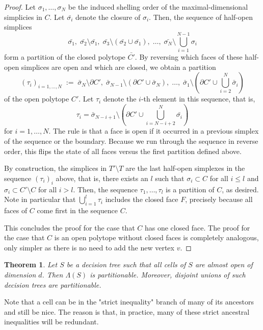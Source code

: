 \documentclass[12pt,reqno]{amsart}
\numberwithin{definition}{section}
\newtheorem{theorem}[definition]{Theorem}
\theoremstyle{definition}
\newcommand{\allow}{\Lambda} %
\begin{document}
\begin{proof}
Let $\sigma_1,\ldots,\sigma_N$ be the induced shelling order of the maximal-dimensional simplicies in $C$. Let $\bar{\sigma_i}$ denote the closure of $\sigma_i$. Then, the sequence of half-open simplices
\[
  \bar{\sigma_1}, \; \bar{\sigma_2}\setminus \bar{\sigma_1}, \; \bar{\sigma_3}\setminus  (\bar{\sigma_2} \cup \bar{\sigma_1}), \; \ldots, \; \bar{\sigma_N} \setminus \bigcup_{i=1}^{N-1} \sigma_i
\]
form a partition of the closed polytope $\bar{C'}$. By reversing which faces of these half-open simplices are open and which are closed, we obtain a partition 
\[
  (\tau_i)_{i=1,\ldots,N}\;  :=\; \bar{\sigma}_N\setminus \partial C' ,\;  \bar{\sigma}_{N-1}\setminus (\partial C' \cup\bar{\sigma}_N),\;  \ldots,\;  \bar{\sigma}_1 \setminus  (\partial C' \cup \bigcup_{i=2}^N \bar{\sigma}_i)
\]
of the open polytope $C'$. Let $\tau_i$ denote the $i$-th element in this sequence, that is, 
\[
  \tau_i = \bar{\sigma}_{N-i+1} \setminus (\partial C' \cup \bigcup_{i=N-i+2}^N \bar{\sigma_i})
\]
for $i=1,\ldots,N$. The rule is that a face is open if it occurred in a previous simplex of the sequence or the boundary. Because we run through the sequence in reverse order, this flips the state of all faces versus the first partition defined above.

By construction, the simplices in $T'\setminus T$ are the last half-open simplexes in the sequence $(\tau_i)_i$ above, that is, there exists an $l$ such that $\sigma_i\subset C$ for all $i\leq l$ and $\sigma_i\subset C'\setminus C$ for all $i>l$. Then, the sequence $\tau_1,\ldots,\tau_l$ is a partition of $C$, as desired. Note in particular that $\bigcup_{i=1}^l \tau_i$ includes the closed face $F$, precisely because all faces of $C$ come first in the sequence $C$.

This concludes the proof for the case that $C$ has one closed face. The proof for the case that $C$ is an open polytope without closed faces is completely analogous, only simpler as there is no need to add the new vertex $v$.
\end{proof}

\begin{theorem}
Let $S$ be a decision tree such that all cells of $S$ are almost open of dimension $d$. Then $\allow(S)$ is partitionable. Moreover, disjoint unions of such decision trees are partitionable.
\end{theorem}

Note that a cell can be in the "strict inequality" branch of many of its ancestors and still be nice. The reason is that, in practice, many of these strict ancestral inequalities will be redundant.
\end{document}
